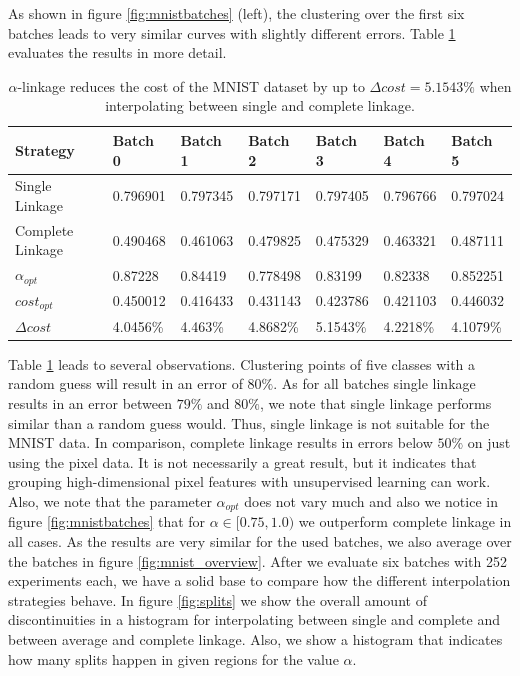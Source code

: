 As shown in figure \ref{fig:mnistbatches} (left), the clustering over the first six batches leads to very similar curves with slightly different errors. Table \ref{table:mnistscbatches} evaluates the results in more detail.

\begin{table}[H]
    \centering
    \begin{tabular}{|l | l l l l l l |}
    \hline
    Strategy & Batch 0 & Batch 1 & Batch 2 & Batch 3 & Batch 4 & Batch 5\\ \hline
    Single Linkage & 0.796901 & 0.797345 & 0.797171 & 0.797405 & 0.796766 & 0.797024\\
    Complete Linkage & 0.490468 & 0.461063 & 0.479825 & 0.475329 & 0.463321 & 0.487111\\
    $\alpha_{opt}$ & 0.87228 & 0.84419 & 0.778498 & 0.83199 & 0.82338 & 0.852251\\
    $cost_{opt}$ & 0.450012 & 0.416433 & 0.431143 & 0.423786 & 0.421103 & 0.446032\\
    $\Delta cost$ & 4.0456\% & 4.463\% & 4.8682\% & 5.1543\% & 4.2218\% & 4.1079\%\\\hline
    \end{tabular}
    \caption{$\alpha$-linkage reduces the cost of the MNIST dataset by up to $\Delta cost = 5.1543\%$ when interpolating between single and complete linkage.}
    \label{table:mnistscbatches}
\end{table}

Table \ref{table:mnistscbatches} leads to several observations. Clustering points of five classes with a random guess will result in an error of $80\%$. As for all batches single linkage results in an error between $79\%$ and $80\%$, we note that single linkage performs similar than a random guess would. Thus, single linkage is not suitable for the MNIST data. In comparison, complete linkage results in errors below $50\%$ on just using the pixel data. It is not necessarily a great result, but it indicates that grouping high-dimensional pixel features with unsupervised learning can work. Also, we note that the parameter $\alpha_{opt}$ does not vary much and also we notice in figure \ref{fig:mnistbatches} that for $\alpha \in [0.75,1.0)$ we outperform complete linkage in all cases. As the results are very similar for the used batches, we also average over the batches in figure \ref{fig:mnist_overview}. After we evaluate six batches with 252 experiments each, we have a solid base to compare how the different interpolation strategies behave. In figure \ref{fig:splits} we show the overall amount of discontinuities in a histogram for interpolating between single and complete and between average and complete linkage. Also, we show a histogram that indicates how many splits happen in given regions for the value $\alpha$.

